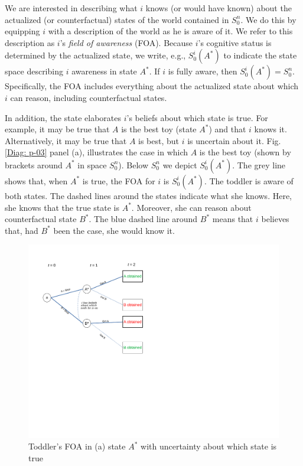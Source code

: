 \documentclass[
11pt,
titlepage,
reqno,
]{article}%
\theoremstyle{definition}
\begin{document}
We are interested in describing what $i$ knows (or would have known) about the actualized (or counterfactual) states of the world contained in $S^n_0$. We do this by equipping $i$ with a description of the world as he is aware of it. We refer to this description as $i$'s \textit{field of awareness} (FOA). Because $i$'s cognitive status is determined by the actualized state, we write, e.g.,  $S^i_0(A^\ast)$ to indicate the state space describing $i$ awareness in state $A^\ast$. If $i$ is fully aware, then $S^i_0(A^\ast)=S^n_0$. Specifically, the FOA includes everything about the actualized state about which $i$ can reason, including counterfactual states. 

In addition, the state elaborates $i$'s beliefs about which state is true. For example, it may be true that $A$ is the best toy (state $A^\ast$) and that $i$ knows it. Alternatively, it may be true that $A$ is best, but $i$ is uncertain about it. Fig. \ref{Diag: p-03} panel (a), illustrates the case in which $A$ is the best toy (shown by brackets around $A^\ast$ in space $S^n_0$). Below $S^n_0$ we depict $S^i_0(A^\ast)$. The grey line shows that, when $A^\ast$ is true, the FOA for $i$ is $S^i_0(A^\ast)$. The toddler is aware of both states. The dashed lines around the states indicate what she knows. Here, she knows that the true state is $A^\ast$. Moreover, she can reason about counterfactual state $B^\ast$. The blue dashed line around $B^\ast$ means that $i$ believes that, had $B^\ast$ been the case, she would know it. 

\begin{figure}[h!]
	\centering
	\includegraphics*[page=21,trim = 0in 4.5in 0in .5in,scale=.7]{Awareness_Diagrams_All}
	\caption{Toddler's FOA in (a) state $A^\ast$ with uncertainty about which state is true\label{Diag: p-21}}%
\end{figure}
\end{document}
